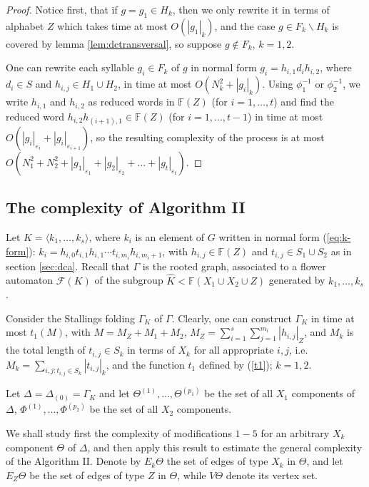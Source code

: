 \documentclass[a4paper,12pt]{article}
\newcommand{\G}{\Gamma }
\newcommand{\D}{\Delta }
\newcommand{\e}{\varepsilon }
\newcommand{\T}{\Theta }
\newcommand{\cF}{{\cal{F}}}
\numberwithin{equation}{section}
\numberwithin{figure}{section}
\newcommand{\FF}{\ensuremath{\mathbb{F}}}
\renewcommand{\cF}{\mathcal{F}}
\newcommand{\la}{\langle}
\newcommand{\ra}{\rangle}
\begin{document}
\begin{proof} Notice first, that if $g = g_1 \in H_k$, then we
only rewrite it in terms of alphabet $Z$ which takes time at most
$O(|g_1|_k)$, and the case $g \in F_k \smallsetminus H_k$ is
covered by lemma \ref{lem:dctransversal}, so suppose $g \notin
F_k$, $k=1,2$.

One can rewrite each syllable $g_i \in F_k$ of $g$ in normal form
$g_i=h_{i,1}d_ih_{i,2}$, where $d_i\in S$ and $h_{i,j}\in H_1\cup
H_2$, in time at most $O(N^2_k + |g_i|_k)$. Using $\phi_1^{-1}$ or
$\phi_2^{-1}$, we write $h_{i,1}$ and $h_{i,2}$ as reduced words
in $\FF(Z)$ (for $i=1, \ldots, t$) and find the reduced word
$h_{i,2}h_{(i+1),1}\in \FF(Z)$ (for $i=1, \ldots, t-1$) in time at
most $O(|g_i|_{\e_i}+|g_i|_{\e_{i+1}})$, so the resulting
complexity of the process is at most $O(N^2_1+ N^2_2 +
|g_1|_{\e_1}+|g_2|_{\e_2}+ \ldots +|g_t|_{\e_t})$. \end{proof}


\subsection{The complexity of Algorithm II}\label{sub:resolution}

Let $K=\la k_1, \ldots , k_s\ra$, where $k_i$ is an element of $G$
written in normal form (\ref{eq:k-form}): $k_i=
h_{i,0}t_{i,1}h_{i,1}\cdots t_{i,m_i}h_{i,m_i+1}$, with
$h_{i,j}\in \FF(Z)$ and $t_{i,j}\in S_1\cup S_2$ as in section
\ref{sec:dca}. Recall that $\G$ is the rooted graph, associated to
a flower automaton $\cF(K)$ of the subgroup $\hat K < \FF(X_1\cup
X_2 \cup Z)$ generated by $k_1, \ldots , k_s$.

Consider the Stallings folding $\G_K$ of $\G$. Clearly, one can
construct $\G_K$ in time at most $t_1(M)$, with $M = M_Z+M_1+M_2$,
 $M_Z =
\mathop{\sum}\limits_{i=1}^{s}
\mathop{\sum}\limits_{j=1}^{m_i}|h_{i,j}|_Z$, and $M_k$ is the
total length of $t_{i,j} \in S_k$ in terms of $X_k$ for all
appropriate $i,j$, i.e. $M_k = \mathop{\sum}\limits_{i,j:
t_{i,j}\in S_k} |t_{i,j}|_k$, and the function $t_1$ defined by
(\ref{t1}); $k=1,2$.

Let $\D=\D_{(0)} = \G_K$ and let $\T^{(1)}, \ldots, \T^{(p_1)}$ be
the set of all $X_1$ components of $\D$, $\Phi^{(1)}, \ldots,
\Phi^{(p_2)}$ be the set of all $X_2$ components.

We shall study first the complexity of modifications $1-5$ for an
arbitrary $X_k$ component $\T$ of $\D$, and then apply this result
to estimate the general complexity of the Algorithm II. Denote by
$E_k \T$ the set of edges of type $X_k$ in $\T$, and let $E_Z \T$
be the set of edges of type $Z$ in $\T$, while $V \T$ denote its
vertex set.
\end{document}
